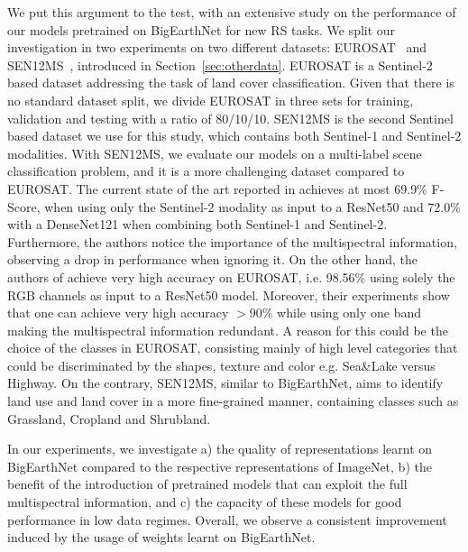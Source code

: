 \documentclass[journal]{IEEEtran}
\begin{document}
We put this argument to the test, with an extensive study on the performance of our models pretrained on BigEarthNet for new RS tasks. We split our investigation in two experiments on two different datasets: EUROSAT~\citep{helber2019eurosat} and SEN12MS~\citep{Schmitt2021}, introduced in Section~\ref{sec:otherdata}. EUROSAT is a Sentinel-2 based dataset addressing the task of land cover classification. 
Given that there is no standard dataset split, we divide EUROSAT in three sets for training, validation and testing with a ratio of 80/10/10. SEN12MS is the second Sentinel based dataset we use for this study, which contains both Sentinel-1 and Sentinel-2 modalities.
With SEN12MS, we evaluate our models on a multi-label scene classification problem, and it is a more challenging dataset compared to EUROSAT. The current state of the art reported in \citep{Schmitt2021} achieves at most 69.9\% F-Score, when using only the Sentinel-2 modality as input to a ResNet50 and 72.0\% with a DenseNet121 when combining both Sentinel-1 and Sentinel-2. Furthermore, the authors notice the importance of the multispectral information, observing a drop in performance when ignoring it. On the other hand, the authors of \citep{helber2019eurosat} achieve very high accuracy on EUROSAT, i.e. 98.56\% using solely the RGB channels as input to a ResNet50 model.
Moreover, their experiments show that one can achieve very high accuracy $>90\%$ while using only one band making the multispectral information redundant. A reason for this could be the choice of the classes in EUROSAT, consisting mainly of high level categories that could be discriminated by the shapes, texture and color e.g. Sea\&Lake versus Highway. On the contrary, SEN12MS, similar to BigEarthNet, aims to identify land use and land cover in a more fine-grained manner, containing classes such as Grassland, Cropland and Shrubland.


In our experiments, we investigate a) the quality of representations learnt on BigEarthNet compared to the respective representations of ImageNet, b) the benefit of the introduction of pretrained models that can exploit the full multispectral information, and c) the capacity of these models for good performance in low data regimes. Overall, we observe a consistent improvement induced by the usage of weights learnt on BigEarthNet.
\end{document}
